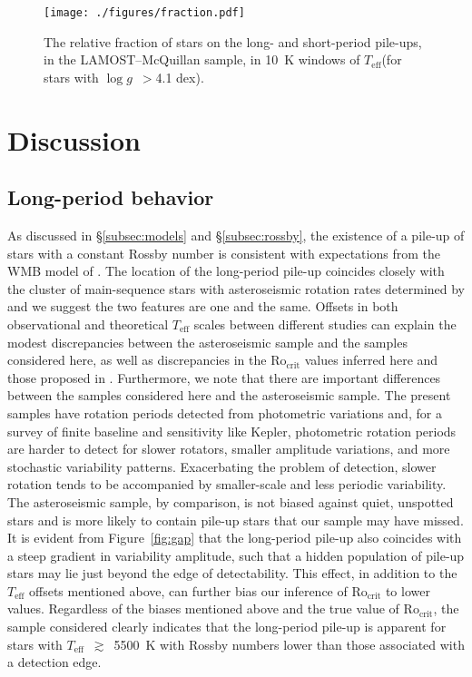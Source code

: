 \documentclass[linenumbers,trackchanges,twocolumn]{aastex631}
\newcommand{\rocrit}{$\mathrm{Ro_{crit}}$\xspace}
\newcommand{\lamostmcq}{LAMOST--McQuillan\xspace}
\newcommand{\teffmin}{5500~K\xspace}
\newcommand{\teff}{\ensuremath{T_{\mathrm{eff}}}\xspace}
\newcommand{\logg}{\ensuremath{\log g}\xspace}
\begin{document}
\begin{figure}
    \centering
    \texttt{[image: ./figures/fraction.pdf]}
    \caption{The relative fraction of stars on the long- and short-period pile-ups, in the \lamostmcq sample, in 10~K windows of \teff (for stars with \logg~$>$4.1 dex).}
    \label{fig:fraction}
\end{figure}


\section{Discussion} \label{sec:discussion}

\subsection{Long-period behavior} \label{subsec:longperiod}

As discussed in \S\ref{subsec:models} and \S\ref{subsec:rossby}, the existence of a pile-up of stars with a constant Rossby number is consistent with expectations from the WMB model of \citet{vanSaders2016, vanSaders2019}. The location of the long-period pile-up coincides closely with the cluster of main-sequence stars with asteroseismic rotation rates determined by \citet{Hall2021} and we suggest the two features are one and the same. Offsets in both observational and theoretical \teff scales between different studies can explain the modest discrepancies between the asteroseismic sample and the samples considered here, as well as discrepancies in the \rocrit values inferred here and those proposed in \citet{vanSaders2019}. Furthermore, we note that there are important differences between the samples considered here and the \citet{Hall2021} asteroseismic sample. The present samples have rotation periods detected from photometric variations and, for a survey of finite baseline and sensitivity like Kepler, photometric rotation periods are harder to detect for slower rotators, smaller amplitude variations, and more stochastic variability patterns. Exacerbating the problem of detection, slower rotation tends to be accompanied by smaller-scale and less periodic variability. The asteroseismic sample, by comparison, is not biased against quiet, unspotted stars and is more likely to contain pile-up stars that our sample may have missed. It is evident from Figure~\ref{fig:gap} that the long-period pile-up also coincides with a steep gradient in variability amplitude, such that a hidden population of pile-up stars may lie just beyond the edge of detectability. This effect, in addition to the \teff offsets mentioned above, can further bias our inference of \rocrit to lower values. Regardless of the biases mentioned above and the true value of \rocrit, the sample considered clearly indicates that the long-period pile-up is apparent for stars with \teff~$\gtrsim$~\teffmin with Rossby numbers lower than those associated with a detection edge.
\end{document}

